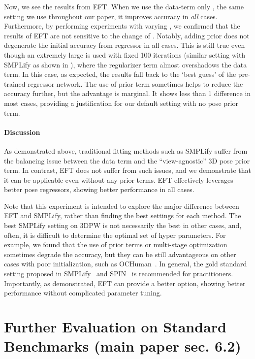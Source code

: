 \documentclass[10pt,twocolumn,letterpaper]{article}
\begin{document}
Now, we see the results from EFT. When we use the data-term only , the same setting we use throughout our paper, it improves accuracy in \emph{all} cases. Furthermore, by performing experiments with varying , we confirmed that the results of EFT are not sensitive to the change of . Notably, adding prior does not degenerate the initial accuracy from regressor in all cases. This is still true even though an extremely large  is used with fixed 100 iterations (similar setting with SMPLify as shown in ), where the regularizer term almost overshadows the data term. In this case, as expected, the results fall back to the ‘best guess’ of the pre-trained regressor network. The use of prior term sometimes helps to reduce the accuracy further, but the advantage is marginal. It shows less than 1 difference in most cases, providing a justification for our default setting with no pose prior term.
	
	\paragraph{Discussion}
	As demonstrated above, traditional fitting methods such as SMPLify suffer from the balancing issue between the data term and the ``view-agnostic'' 3D pose prior term. In contrast, EFT does not suffer from such issues, and we demonstrate that it can be applicable even without any prior terms. EFT effectively leverages better pose regressors, showing better performance in all cases.
	
	Note that this experiment is intended to explore the major difference between EFT and SMPLify, rather than finding the best settings for each method. The best SMPLify setting on 3DPW is not necessarily the best in other cases, and, often, it is difficult to determine the optimal set of hyper parameters. For example, we found that the use of prior terms or multi-stage optimization sometimes degrade the accuracy, but they can be still advantageous on other cases with poor initialization, such as OCHuman~\cite{pose2seg2019}. In general, the gold standard setting proposed in SMPLify~\cite{Bogo2016} and SPIN~\cite{kolotouros2019spin} is recommended for practitioners. Importantly, as demonstrated, EFT can provide a better option, showing better performance without complicated parameter tuning.


	\section{Further Evaluation on Standard Benchmarks (main paper sec. 6.2) }\label{ss:quan-full-table}
	
\end{document}
